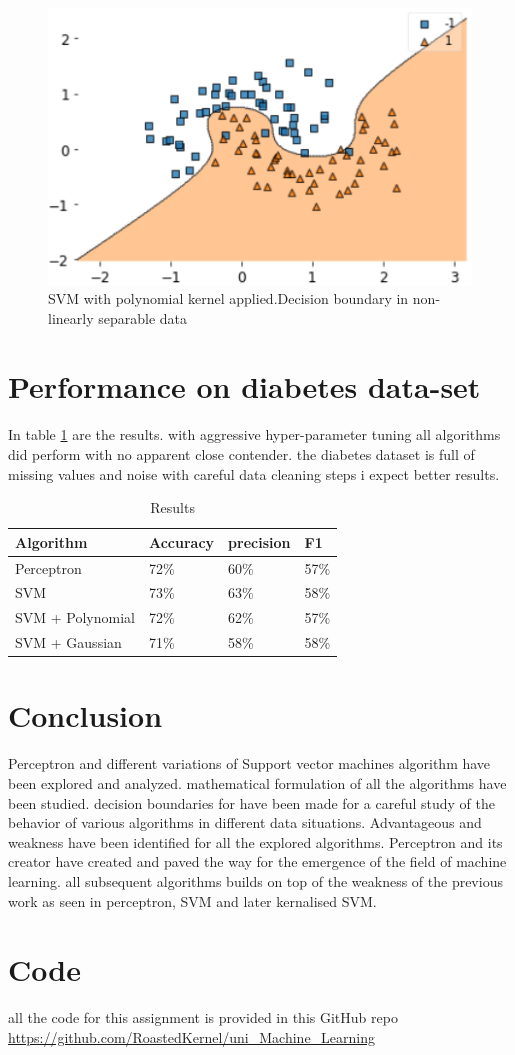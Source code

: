 \documentclass[10pt,twocolumn,letterpaper]{article}
\begin{document}
\begin{figure}[htb]
  \includegraphics[width=\linewidth]{svm_k_non.png}
  \caption{SVM with polynomial kernel applied.Decision boundary in non-linearly separable data}
  \label{fig:svm_exp_k}
\end{figure}


\section{Performance on diabetes data-set}
In table \ref{tab:res} are the results. with aggressive hyper-parameter tuning all algorithms did perform with no apparent close contender. the diabetes dataset is full of missing values and noise with careful data cleaning steps i expect better results. 

\begin{table}[htb]
\centering
\begin{tabular}{|l|l|l|l|} 
\toprule
Algorithm         & Accuracy & precision & F1    \\ 
\hline
Perceptron        & 72\%     & 60\%      & 57\%  \\ 
\hline
SVM               & 73\%     & 63\%      & 58\%  \\ 
\hline
SVM + Polynomial  & 72\%     & 62\%      & 57\%  \\ 
\hline
SVM + Gaussian    & 71\%     & 58\%      & 58\%  \\
\bottomrule
\end{tabular}
\caption{Results}
\label{tab:res}
\end{table}

\section{Conclusion}
Perceptron and different variations of Support vector machines algorithm have been explored and analyzed. mathematical formulation of all the algorithms have been studied. decision boundaries for have been made for a careful study of the behavior of various algorithms in different data situations. Advantageous and weakness have been identified for all the explored algorithms. Perceptron and its creator have created and paved the way for the emergence of the field of machine learning. all subsequent algorithms builds on top of the weakness of the previous work as seen in perceptron, SVM and later kernalised SVM.
\section{Code}

all the code for this assignment is provided in this GitHub repo 
\url{https://github.com/RoastedKernel/uni_Machine_Learning}
 

\end{document}
